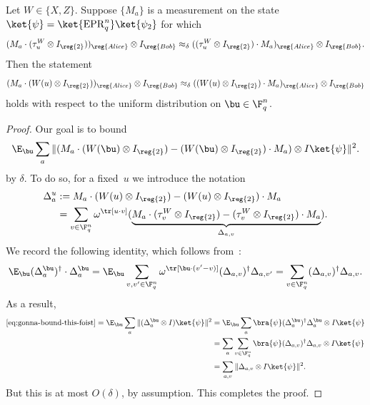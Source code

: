 \begin{lemma}\label{lem:proj-to-obs}
Let $W \in \{X, Z\}$.
Suppose $\{M_{a}\}$ is a measurement on the state $\ket{\psi} = \ket{\mathrm{EPR}_q^n} \ket{\psi_2}$ for which
\begin{equation*}
(M_{a} \cdot (\tau^{W}_{u} \otimes I_{\reg{2}}))_{\reg{Alice}} \otimes I_{\reg{Bob}}
\approx_{\delta} ((\tau^{W}_{u} \otimes I_{\reg{2}}) \cdot M_{a})_{\reg{Alice}} \otimes I_{\reg{Bob}}.
\end{equation*}
Then the statement
\begin{equation*}
(M_{a} \cdot (W(u) \otimes I_{\reg{2}}))_{\reg{Alice}} \otimes I_{\reg{Bob}}
\approx_{\delta} ((W(u) \otimes I_{\reg{2}}) \cdot M_{a})_{\reg{Alice}} \otimes I_{\reg{Bob}}
\end{equation*}
holds with respect to the uniform distribution on $\bu \in \F_q^n$.
\end{lemma}
\begin{proof}
Our goal is to bound
\begin{equation}\label{eq:gonna-bound-this-foist}
\E_{\bu} \sum_{a} \Vert (M_{a} \cdot (W(\bu) \otimes I_{\reg{2}}) - (W(\bu) \otimes I_{\reg{2}}) \cdot M_{a}) \otimes I \ket{\psi} \Vert^2.
\end{equation}
by $\delta$.
To do so, for a fixed~$u$ we introduce the notation
\begin{align}
\Delta_{a}^{u}
&:= M_{a} \cdot (W(u) \otimes I_{\reg{2}}) - (W(u) \otimes I_{\reg{2}}) \cdot M_{a}\nonumber\\
&= \sum_{v \in \F_q^n} \omega^{\tr[u \cdot v]} (\underbrace{M_{a}
	\cdot (\tau^{W}_{v} \otimes I_{\reg{2}})- (\tau^{W}_v \otimes I_{\reg{2}}) \cdot M_{a}}_{\Delta_{a,v}}).\label{eq:pauli-obs-commutator-foist}
\end{align}
We record the following identity, which follows from~:
\begin{equation*}
\E_{\bu} (\Delta_{a}^{\bu})^\dagger\cdot \Delta_{a}^{\bu}
= \E_{\bu} \sum_{v, v' \in \F_q^n} \omega^{\tr[\bu \cdot (v' - v)]} (\Delta_{a,v})^\dagger \Delta_{a,v'}
= \sum_{v \in \F_q^n} (\Delta_{a,v})^\dagger \Delta_{a,v}.
\end{equation*}
As a result,
\begin{align*}
\eqref{eq:gonna-bound-this-foist}=
\E_{\bu} \sum_{a}\Vert (\Delta_{a}^{\bu} \otimes I) \ket{\psi}\Vert^2
&= \E_{\bu} \sum_{a} \bra{\psi} (\Delta_{a}^{\bu})^\dagger \Delta_{a}^{\bu} \otimes I \ket{\psi}\\
&=  \sum_{a} \sum_{v \in \F_q^n} \bra{\psi}(\Delta_{a,v})^\dagger \Delta_{a,v} \otimes I \ket{\psi}\\
&= \sum_{a, v} \Vert \Delta_{a,v} \otimes I \ket{\psi} \Vert^2.
\end{align*}
But this is at most $O(\delta)$, by assumption. This completes the proof.
\end{proof}

